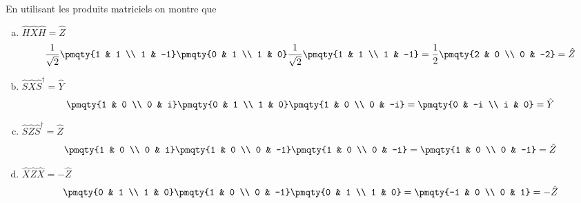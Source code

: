 En utilisant les produits matriciels on montre que   \vspace{4pt}
    \begin{enumerate}[a)]
        \item $\hat{H}\hat{X}\hat{H} = \hat{Z}$
        \begin{align*}
            \frac{1}{\sqrt{2}}\pmqty{1 & 1 \\ 1 & -1}\pmqty{0 & 1 \\ 1 & 0}\frac{1}{\sqrt{2}}\pmqty{1 & 1 \\ 1 & -1} = \frac{1}{2}\pmqty{2 & 0 \\ 0 & -2} = \hat{Z}
        \end{align*}
        \item $\hat{S}\hat{X}\hat{S}^\dagger = \hat{Y}$
        \begin{align*}
            \pmqty{1 & 0 \\ 0 & i}\pmqty{0 & 1 \\ 1 & 0}\pmqty{1 & 0 \\ 0 & -i} = \pmqty{0 & -i \\ i & 0} = \hat{Y}
        \end{align*}
        \item $\hat{S}\hat{Z}\hat{S}^\dagger = \hat{Z}$
        \begin{align*}
            \pmqty{1 & 0 \\ 0 & i}\pmqty{1 & 0 \\ 0 & -1}\pmqty{1 & 0 \\ 0 & -i} = \pmqty{1 & 0 \\ 0 & -1} = \hat{Z}
        \end{align*}
        \item $\hat{X}\hat{Z}\hat{X} = -\hat{Z}$
        \begin{align*}
            \pmqty{0 & 1 \\ 1 & 0} \pmqty{1 & 0 \\ 0 & -1} \pmqty{0 & 1 \\ 1 & 0} = \pmqty{-1 & 0 \\ 0 & 1} = -\hat{Z}
        \end{align*}
    \end{enumerate}
